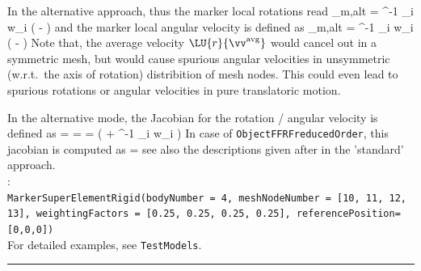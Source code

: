     In the alternative approach, thus the marker local rotations read
    \be
      _{m,alt} = \Wm^{-1} \sum_i w_i  \left(  -  \right) \eqComma
    \ee
    and the marker local angular velocity is defined as
    \be
      _{m,alt} = \Wm^{-1} \sum_i w_i  \left(  -  \right) \eqDot
    \ee
    Note that, the average velocity $\LU{r}{\vv^\mathrm{avg}}$ would cancel out in a symmetric mesh, but would cause spurious 
    angular velocities in unsymmetric (w.r.t.\ the axis of rotation) distribition of mesh nodes. 
    This could even lead to spurious rotations or angular velocities in pure translatoric motion.

    In the alternative mode, the Jacobian for the rotation / angular velocity is defined as
    \be
       = 
                  = 
                  =  \left(  + 
                                        \Wm^{-1} \sum_i w_i  \right)
    \ee
    In case of \texttt{ObjectFFRFreducedOrder}, this jacobian is computed as
    \be
       = 
    \ee
    see also the descriptions given after  in the 'standard' approach.
    \vspace{12pt}\\
    :\vspace{6pt}\\
    \texttt{MarkerSuperElementRigid(bodyNumber = 4, meshNodeNumber = [10, 11, 12, 13], weightingFactors = [0.25, 0.25, 0.25, 0.25], referencePosition=[0,0,0])}
    \vspace{12pt}\\
    \noindent For detailed examples, see \texttt{TestModels}.
\vspace{6pt}\par\noindent\rule{\textwidth}{0.4pt}
